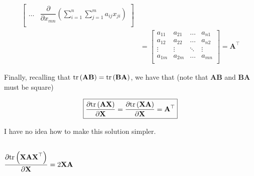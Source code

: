 \documentclass{article}
\newcommand{\trans}{\top}
\begin{document}
\begin{align*}
\begin{bmatrix}
        \dots & 
        \displaystyle \dfrac{\partial}{\partial x_{mn}} \left( \sum_{i = 1}^{n} \sum_{j = 1}^{m} a_{ij}x_{ji} \right) \\
    \end{bmatrix} \\
    &= \begin{bmatrix}
            a_{11} & a_{21} & \dots & a_{n1} \\
            a_{12} & a_{22} & \dots & a_{n2} \\
            \vdots & \vdots & \ddots & \vdots \\
            a_{1m} & a_{2m} & \dots & a_{mn} \\
        \end{bmatrix} = \mathbf{A}^\top
\end{align*}

Finally, recalling that \(\textnormal{tr}\left( \mathbf{AB} \right) = \textnormal{tr}\left( \mathbf{BA} \right)\), we have that (note that \(\mathbf{AB}\) and \(\mathbf{BA}\) must be square)

\begin{align}
    \boxed{\dfrac{\partial \textnormal{tr}\left(\mathbf{A} \mathbf{X}\right)}{\partial \mathbf{X}} = \dfrac{\partial \textnormal{tr}\left(\mathbf{X} \mathbf{A}\right)}{\partial \mathbf{X}} = \mathbf{A}^\trans}
\end{align}

I have no idea how to make this solution simpler.

\subsection{\(\dfrac{\partial \textnormal{tr}\left(\mathbf{XAX}^\top\right)}{\partial \mathbf{X}} = 2\mathbf{XA}\)}
\end{document}
